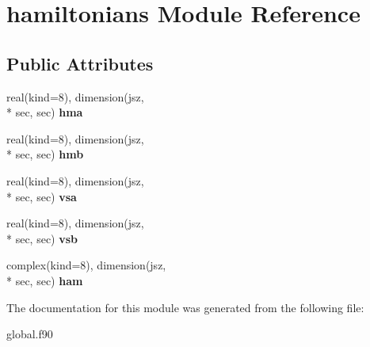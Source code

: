 \hypertarget{classhamiltonians}{\section{hamiltonians Module Reference}
\label{classhamiltonians}
}
\subsection*{Public Attributes}
\begin{DoxyCompactItemize}
\item 
\hypertarget{classhamiltonians_a42cb905a03240cad861279c6ef1e7c4d}{real(kind=8), dimension(jsz, \\*
sec, sec) {\bfseries hma}}\label{classhamiltonians_a42cb905a03240cad861279c6ef1e7c4d}

\item 
\hypertarget{classhamiltonians_a3ca70d784074e79fe2e8fe80f2af5466}{real(kind=8), dimension(jsz, \\*
sec, sec) {\bfseries hmb}}\label{classhamiltonians_a3ca70d784074e79fe2e8fe80f2af5466}

\item 
\hypertarget{classhamiltonians_a93f0b4cc9273a2e3f502ef0e5925d9c5}{real(kind=8), dimension(jsz, \\*
sec, sec) {\bfseries vsa}}\label{classhamiltonians_a93f0b4cc9273a2e3f502ef0e5925d9c5}

\item 
\hypertarget{classhamiltonians_ac995a45aeec063e7ccf229c235e2cdc0}{real(kind=8), dimension(jsz, \\*
sec, sec) {\bfseries vsb}}\label{classhamiltonians_ac995a45aeec063e7ccf229c235e2cdc0}

\item 
\hypertarget{classhamiltonians_a7fb5990fd9a3bc493a56cc73516ca75f}{complex(kind=8), dimension(jsz, \\*
sec, sec) {\bfseries ham}}\label{classhamiltonians_a7fb5990fd9a3bc493a56cc73516ca75f}

\end{DoxyCompactItemize}


The documentation for this module was generated from the following file\-:\begin{DoxyCompactItemize}
\item 
global.\-f90\end{DoxyCompactItemize}
